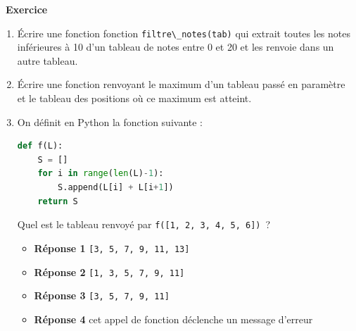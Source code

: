 \documentclass[
  11pt,
]{article}
\newcommand{\passthrough}[1]{#1}
\providecommand{\tightlist}{%
  \setlength{\itemsep}{0pt}\setlength{\parskip}{0pt}}
\newcounter{exo}
\newenvironment{exercice}[1]
{\par \medskip   \addtocounter{exo}{1} \noindent  
\begin{bclogo}[arrondi =0.1,   noborder = true, logo=\bccrayon, marge=4]{~\textbf{Exercice} \textbf{\theexo} {\itshape #1} }  \par}
{
\end{bclogo}
 \par \bigskip }
\newcounter{def}
\begin{document}
\begin{exercice}{}

\begin{enumerate}
\def\labelenumi{\arabic{enumi}.}
\item
  Écrire une fonction fonction
  \passthrough{\lstinline!filtre\_notes(tab)!} qui extrait toutes les
  notes inférieures à 10 d'un tableau de notes entre 0 et 20 et les
  renvoie dans un autre tableau.
\item
  Écrire une fonction renvoyant le maximum d'un tableau passé en
  paramètre et le tableau des positions où ce maximum est atteint.
\item
  On définit en Python la fonction suivante :

\begin{lstlisting}[language=Python]
def f(L):
    S = []
    for i in range(len(L)-1):
        S.append(L[i] + L[i+1])
    return S
\end{lstlisting}

  Quel est le tableau renvoyé par
  \passthrough{\lstinline!f([1, 2, 3, 4, 5, 6])!}~?

  \begin{itemize}
  \tightlist
  \item
    \textbf{Réponse 1} \passthrough{\lstinline![3, 5, 7, 9, 11, 13]!}
  \item
    \textbf{Réponse 2} \passthrough{\lstinline![1, 3, 5, 7, 9, 11]!}
  \item
    \textbf{Réponse 3} \passthrough{\lstinline![3, 5, 7, 9, 11]!}
  \item
    \textbf{Réponse 4} cet appel de fonction déclenche un message
    d'erreur
  \end{itemize}
\end{enumerate}

\end{exercice}
\end{document}

